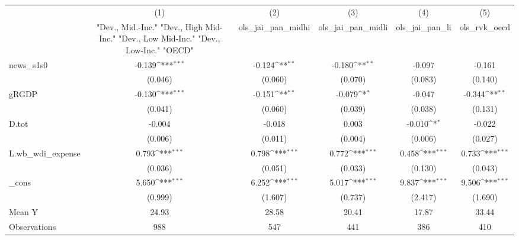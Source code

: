 {
\def\sym#1{\ifmmode^{#1}\else\(^{#1}\)\fi}
\begin{tabular}{l*{5}{c}}
\toprule
            &\multicolumn{1}{c}{(1)}&\multicolumn{1}{c}{(2)}&\multicolumn{1}{c}{(3)}&\multicolumn{1}{c}{(4)}&\multicolumn{1}{c}{(5)}\\
            &\multicolumn{1}{c}{ "Dev., Mid.-Inc." "Dev., High Mid-Inc." "Dev., Low Mid-Inc." "Dev., Low-Inc." "OECD" }&\multicolumn{1}{c}{ols\_jai\_pan\_midhi}&\multicolumn{1}{c}{ols\_jai\_pan\_midli}&\multicolumn{1}{c}{ols\_jai\_pan\_li}&\multicolumn{1}{c}{ols\_rvk\_oecd}\\
\midrule
news\_s1s0   &      -0.139\sym{***}&      -0.124\sym{**} &      -0.180\sym{**} &      -0.097         &      -0.161         \\
            &     (0.046)         &     (0.060)         &     (0.070)         &     (0.083)         &     (0.140)         \\
\addlinespace
gRGDP       &      -0.130\sym{***}&      -0.151\sym{**} &      -0.079\sym{*}  &      -0.047         &      -0.344\sym{**} \\
            &     (0.041)         &     (0.060)         &     (0.039)         &     (0.038)         &     (0.131)         \\
\addlinespace
D.tot       &      -0.004         &      -0.018         &       0.003         &      -0.010\sym{*}  &      -0.022         \\
            &     (0.006)         &     (0.011)         &     (0.004)         &     (0.006)         &     (0.027)         \\
\addlinespace
L.wb\_wdi\_expense&       0.793\sym{***}&       0.798\sym{***}&       0.772\sym{***}&       0.458\sym{***}&       0.733\sym{***}\\
            &     (0.036)         &     (0.051)         &     (0.033)         &     (0.130)         &     (0.043)         \\
\addlinespace
\_cons      &       5.650\sym{***}&       6.252\sym{***}&       5.017\sym{***}&       9.837\sym{***}&       9.506\sym{***}\\
            &     (0.999)         &     (1.607)         &     (0.737)         &     (2.417)         &     (1.690)         \\
\midrule
Mean Y      &       24.93         &       28.58         &       20.41         &       17.87         &       33.44         \\
Observations&         988         &         547         &         441         &         386         &         410         \\
\bottomrule
\end{tabular}
}
